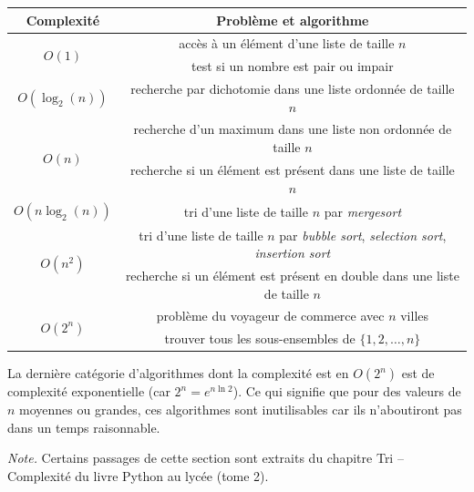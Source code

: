\documentclass[11pt,class=report,crop=false]{standalone}
\begin{document}
\begin{center}
\begin{tabular}{|c|c|}
\hline
Complexité & Problème et algorithme \\ \hline\hline
\multirow{2}{*}{$O(1)$} & accès à un élément d'une liste de taille $n$ \\ 
                        & test si un nombre est pair ou impair \\ \hline
$O(\log_2(n))$          & recherche par dichotomie dans une liste ordonnée de taille $n$ \\ \hline
\multirow{2}{*}{$O(n)$} & recherche d'un maximum dans une liste non ordonnée  de taille $n$\\ 
                        & recherche si un élément  est présent dans une liste  de taille $n$\\ \hline
$O(n\log_2(n))$         & tri d'une liste  de taille $n$ par \emph{mergesort} \\ \hline   
\multirow{2}{*}{$O(n^2)$} & tri d'une liste  de taille $n$ par \emph{bubble sort}, \emph{selection sort}, \emph{insertion sort} \\ 
                        & recherche si un élément est présent en double dans une liste  de taille $n$\\ \hline
\multirow{2}{*}{$O(2^n)$} & problème du voyageur de commerce avec $n$ villes\\ 
                        & trouver tous les sous-ensembles de $\{1,2,\ldots,n\}$ \\ \hline  
\end{tabular}
\end{center}

La dernière catégorie d'algorithmes dont la complexité est en $O(2^n)$ est de complexité exponentielle (car $2^n = e^{n\ln2}$). 
Ce qui signifie que pour des valeurs de $n$ moyennes ou grandes, ces algorithmes sont inutilisables car ils n'aboutiront pas dans un temps raisonnable.


\bigskip
\bigskip
 	
\emph{Note.} Certains passages de cette section sont extraits du chapitre \og{}Tri -- Complexité\fg{} du livre \og{}Python au lycée (tome 2)\fg{}.
\end{document}
